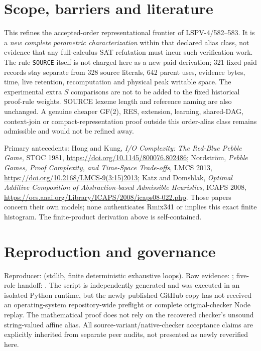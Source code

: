 \documentclass[11pt]{article}
\begin{document}
\section*{Scope, barriers and literature}
This refines the accepted-order representational frontier of LSPV-4/582--583. It is a \emph{new complete parametric characterization} within that declared alias class, not evidence that any full-calculus SAT refutation must incur such verification work. The rule \texttt{SOURCE} itself is not charged here as a new paid derivation; 321 fixed paid records stay separate from 328 source literals, 642 parent uses, evidence bytes, time, live retention, recomputation and physical peak writable space. The experimental extra $S$ comparisons are not to be added to the fixed historical proof-rule weights. SOURCE lexeme length and reference naming are also unchanged. A genuine cheaper GF(2), RES, extension, learning, shared-DAG, context-join or compact-representation proof outside this order-alias class remains admissible and would not be refined away.

Primary antecedents: Hong and Kung, \emph{I/O Complexity: The Red-Blue Pebble Game}, STOC 1981, \url{https://doi.org/10.1145/800076.802486}; Nordstr\"om, \emph{Pebble Games, Proof Complexity, and Time-Space Trade-offs}, LMCS 2013, \url{https://doi.org/10.2168/LMCS-9(3:15)2013}; Katz and Domshlak, \emph{Optimal Additive Composition of Abstraction-based Admissible Heuristics}, ICAPS 2008, \url{https://ocs.aaai.org/Library/ICAPS/2008/icaps08-022.php}. Those papers concern their own models; none authenticates Rmix341 or implies this exact finite histogram. The finite-product derivation above is self-contained.

\section*{Reproduction and governance}
Reproducer:  (stdlib, finite deterministic exhaustive loops). Raw evidence: ; five-role handoff: . The script is independently generated and was executed in an isolated Python runtime, but the newly published GitHub copy has not received an operating-system repository-wide preflight or complete original-checker Node replay. The mathematical proof does not rely on the recovered checker's unsound string-valued affine alias. All source-variant/native-checker acceptance claims are explicitly inherited from separate peer audits, not presented as newly reverified here.
\end{document}
